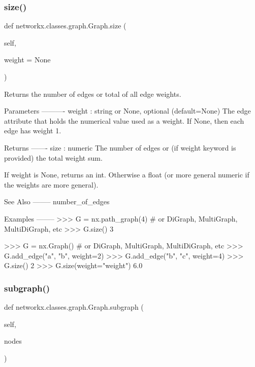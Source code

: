 \subsubsection{\texorpdfstring{size()}{size()}}
{\footnotesize\ttfamily def networkx.\+classes.\+graph.\+Graph.\+size (\begin{DoxyParamCaption}\item[{}]{self,  }\item[{}]{weight = {\ttfamily None} }\end{DoxyParamCaption})}

\begin{DoxyVerb}Returns the number of edges or total of all edge weights.

Parameters
----------
weight : string or None, optional (default=None)
    The edge attribute that holds the numerical value used
    as a weight. If None, then each edge has weight 1.

Returns
-------
size : numeric
    The number of edges or
    (if weight keyword is provided) the total weight sum.

    If weight is None, returns an int. Otherwise a float
    (or more general numeric if the weights are more general).

See Also
--------
number_of_edges

Examples
--------
>>> G = nx.path_graph(4)  # or DiGraph, MultiGraph, MultiDiGraph, etc
>>> G.size()
3

>>> G = nx.Graph()  # or DiGraph, MultiGraph, MultiDiGraph, etc
>>> G.add_edge("a", "b", weight=2)
>>> G.add_edge("b", "c", weight=4)
>>> G.size()
2
>>> G.size(weight="weight")
6.0
\end{DoxyVerb}
 \mbox{\label{classnetworkx_1_1classes_1_1graph_1_1Graph_a62b1ba8e0ec5505c68eb398323902cbc}} 
\subsubsection{\texorpdfstring{subgraph()}{subgraph()}}
{\footnotesize\ttfamily def networkx.\+classes.\+graph.\+Graph.\+subgraph (\begin{DoxyParamCaption}\item[{}]{self,  }\item[{}]{nodes }\end{DoxyParamCaption})}

